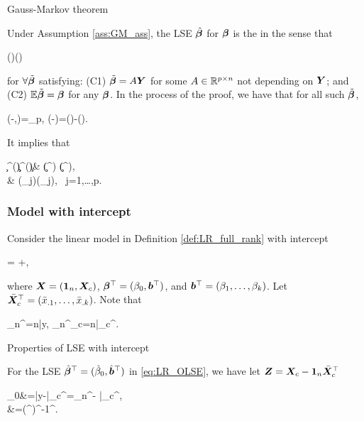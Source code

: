 \documentclass[10pt,a4paper]{book}
\begin{document}
\begin{thmbox}{Gauss-Markov theorem}
	\begin{theorem}\label{thm:GM_OLS}
		Under Assumption \ref{ass:GM_ass}, the LSE $\hat{{\boldsymbol\beta}}$ for ${\boldsymbol\beta}$ is the  in the sense that 
		\begin{sequation*}
			\Cov(\tilde{\bab})\succeq\Cov(\hat{\bab})
		\end{sequation*}
		for $\forall \tilde{{\boldsymbol\beta}}$ satisfying: (C1) $\tilde{{\boldsymbol\beta}}=A{\boldsymbol Y}$ for some $A\in\mathbb R^{p\times n}$ not depending on ${\boldsymbol Y}$; and (C2) $\mathbb E\tilde{{\boldsymbol\beta}}={\boldsymbol\beta}$ for any ${\boldsymbol\beta}$.     
		In the process of the proof, we have that for all such $\tilde{{\boldsymbol\beta}}$, 
		\begin{salign*}
			\Cov(\tilde{\bab}-\hat{\bab},\hat{\bab})=\0_p, \qquad \Cov(\tilde{\bab}-\hat{\bab})=\Cov(\tilde{\bab})-\Cov(\hat{\bab}).
		\end{salign*}
	\end{theorem}
\end{thmbox}
It implies that 
\begin{salign*}
	\c^\TT \Cov(\tilde{\bab})\c \geq \c^\TT \Cov(\hat{\bab})\c \quad  \Leftrightarrow \quad & \Var(\c^\TT \tilde{\bab}) \geq \Var(\c^\TT \hat{\bab}),\\
	& \Var(\tilde{\beta}_j)\geq \Var(\hat{\beta}_j), \ j=1,\ldots,p.
\end{salign*}

\subsubsection{Model with intercept}\label{sec:LR_full_rank_OLS_intercept}
Consider the linear model in Definition \ref{def:LR_full_rank} with intercept
\begin{sequation}\label{eq:LR_mat_intercept}
	=\X {} +{\bave},
\end{sequation}
where ${\boldsymbol X}=({\boldsymbol 1}_n,{\boldsymbol X}_c)$, ${\boldsymbol\beta}^\top=(\beta_0,{\boldsymbol b}^\top)$, and ${\boldsymbol b}^\top=(\beta_1,\ldots,\beta_k)$.
Let $\bar{{\boldsymbol X}}_c^\top=(\bar{x}_{.1},\ldots,\bar{x}_{.k})$.
Note that
\begin{sequation*}
	\1_n^\TT \Y=n\bar{y}, \qquad \1_n^\TT \X_c=n\bar{\X}_c^\TT.
\end{sequation*}
\begin{thmbox}{Properties of LSE with intercept}
	\begin{proposition}\label{prop:LR_LSE_intercept}
		For the LSE $\hat{{\boldsymbol\beta}}^\top=(\hat{\beta}_0,\hat{{\boldsymbol b}}^\top)$ in \eqref{eq:LR_OLSE}, we have let ${\boldsymbol Z}={\boldsymbol X}_c-{\boldsymbol 1}_n\bar{{\boldsymbol X}}_c^\top$ 
		\begin{salign*}
			\hat{\beta}_0&=\bar{y}-\bar{\X}_c^\TT\hat{\b}=\1_n^\TT \Y - \bar{\X}_c^\TT \hat{\b},\\
			\hat{\b}&=(\Z^\TT\Z)^{-1}\Z^\TT\Y.
		\end{salign*}
	\end{proposition}
\end{thmbox}
\end{document}

